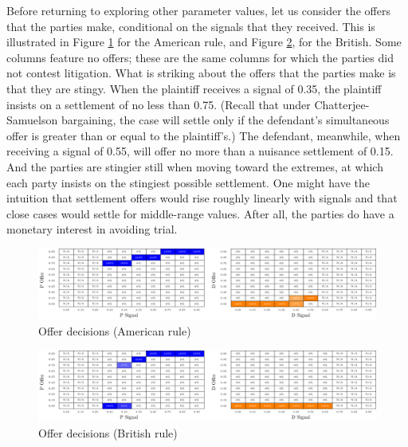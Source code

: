 \documentclass{article}
\begin{document}
Before returning to exploring other parameter values, let us consider the offers that the parties make, conditional on the signals that they received. This is illustrated in Figure \ref{fig:offers_american} for the American rule, and Figure \ref{fig:offers_british}, for the British. Some columns feature no offers; these are the same columns for which the parties did not contest litigation. What is striking about the offers that the parties make is that they are stingy. When the plaintiff receives a signal of 0.35, the plaintiff insists on a settlement of no less than 0.75. (Recall that under Chatterjee-Samuelson bargaining, the case will settle only if the defendant's simultaneous offer is greater than or equal to the plaintiff's.) The defendant, meanwhile, when receiving a signal of 0.55, will offer no more than a nuisance settlement of 0.15. And the parties are stingier still when moving toward the extremes, at which each party insists on the stingiest possible settlement. One might have the intuition that settlement offers would rise roughly linearly with signals and that close cases would settle for middle-range values. After all, the parties do have a monetary interest in avoiding trial. 

\begin{figure}[h!]
\centering
\includegraphics[scale=0.50, trim={0in 0in 0in 0in}, clip]{../Figures/Offers heatmap (American).pdf}
\caption{Offer decisions (American rule)}
\label{fig:offers_american}
\end{figure}

\begin{figure}[h!]
\centering
\includegraphics[scale=0.50, trim={0in 0in 0in 0in}, clip]{../Figures/Offers heatmap (British).pdf}
\caption{Offer decisions (British rule)}
\label{fig:offers_british}
\end{figure}
\end{document}
